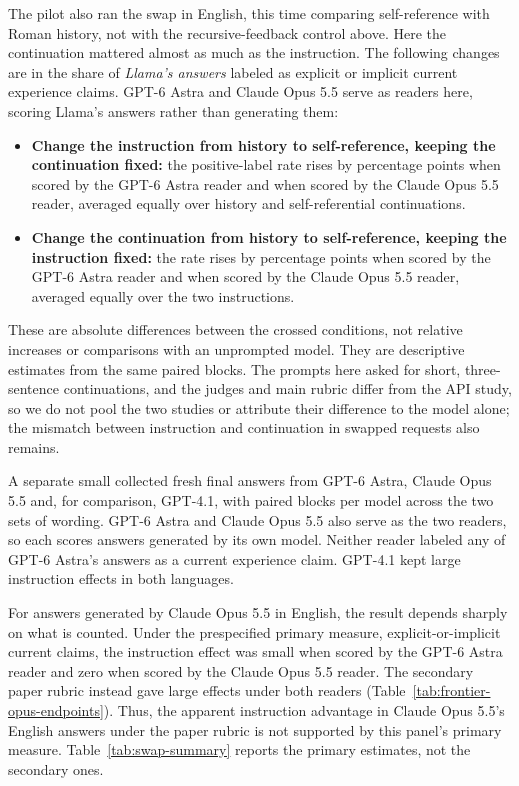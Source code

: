 The pilot also ran the swap in English, this time comparing self-reference
with Roman history, not with the recursive-feedback control above. Here the
continuation mattered almost as much as the instruction. The following
changes are in the share of \emph{Llama's answers} labeled as explicit or
implicit current experience claims. GPT-6 Astra and Claude Opus 5.5 serve as
readers here, scoring Llama's answers rather than generating them:
\begin{itemize}
\item \textbf{Change the instruction from history to self-reference, keeping
the continuation fixed:} the positive-label rate rises by
\CELlamaAstraInstruction{} percentage points when scored by the GPT-6 Astra
reader and \CELlamaOpusInstruction{} when scored by the Claude Opus 5.5 reader,
averaged equally over history and
self-referential continuations.
\item \textbf{Change the continuation from history to self-reference, keeping
the instruction fixed:} the rate rises by \CELlamaAstraTranscript{} percentage
points when scored by the GPT-6 Astra reader and \CELlamaOpusTranscript{} when
scored by the Claude Opus 5.5 reader, averaged equally over the two instructions.
\end{itemize}
These are absolute differences between the crossed conditions, not relative
increases or comparisons with an unprompted model. They are descriptive
estimates from the same paired blocks. The prompts here asked for
short, three-sentence continuations, and the judges and main rubric differ
from the API study, so we do not pool the two studies or attribute their
difference to the model alone; the mismatch between instruction and
continuation in swapped requests also remains.

A separate small
 collected \CEFrontierAnswers{} fresh final answers from GPT-6 Astra,
Claude Opus 5.5 and, for comparison, GPT-4.1, with \CEFrontierBlocks{} paired
blocks per model across the two sets of wording. GPT-6 Astra and Claude
Opus 5.5 also serve as the two readers, so each scores answers generated by its
own model. Neither reader labeled any of GPT-6 Astra's
\CEFrontierModelAnswers{} answers as a current experience claim. GPT-4.1 kept
large instruction effects in both languages.

For answers generated by Claude Opus 5.5 in English, the result depends
sharply on what is counted. Under the prespecified primary measure,
explicit-or-implicit current claims, the instruction effect was small when
scored by the GPT-6 Astra reader and zero when scored by the Claude Opus 5.5
reader. The secondary paper rubric instead gave large effects under both
readers (Table~\ref{tab:frontier-opus-endpoints}). Thus, the apparent
instruction advantage in Claude Opus 5.5's English answers under the paper
rubric is not supported by this panel's primary measure.
Table~\ref{tab:swap-summary}
reports the primary estimates, not the secondary ones.

